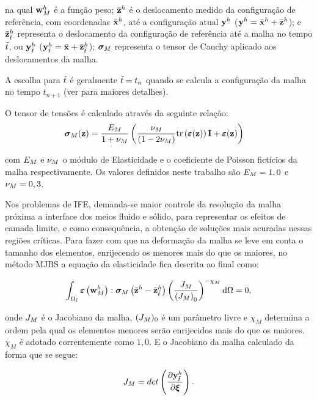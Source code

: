 \noindent na qual $\mathbf{w}_{M}^h$ é a função peso; $\bar{\mathbf{z}}^h$ é o deslocamento medido da configuração de referência, com coordenadas $\bar{\mathbf{x}}^h$, até a configuração atual $\mathbf{y}^h$ ($\mathbf{y}^h = \bar{\mathbf{x}}^h +\bar{\mathbf{z}}^h $); e 
$\bar{\mathbf{z}}_{\tilde{t}}^h$ representa o deslocamento da configuração de referência até a malha no tempo ${\tilde{t}}$, ou $\mathbf{y}^h_{\tilde{t}}$ ($\mathbf{y}^h_{\tilde{t}} = \bar{\mathbf{x}} + \bar{\mathbf{z}}_{\tilde{t}}^h$); $\boldsymbol{\sigma}_{M}$ representa o tensor de Cauchy aplicado aos deslocamentos da malha.

A escolha para $\tilde{t}$ é geralmente $\tilde{t} = {t_{n}}$ quando se calcula a configuração da malha no tempo ${t_{n+1}}$ (ver  para maiores detalhes). 

O tensor de tensões é calculado através da seguinte relação:
\begin{align}
	\boldsymbol{\sigma}_{M}(\mathbf{z})
	&=
	\frac{E_{M}}{1+\nu_{M}}
	\left(
	\frac{\nu_{M}}{(1 - 2 \nu_{M})}
	\mathrm{tr}\left(\bm{\varepsilon}(\mathbf{z})\right)\mathbf{I}
	+
	\bm{\varepsilon}(\mathbf{z})
	\right)
\end{align}

\noindent com $E_{M}$ e $\nu_{M}$ o módulo de Elasticidade e o coeficiente de Poisson fictícios da malha respectivamente. Os valores definidos neste trabalho são $E_{M} =1,0$ e $\nu_{M} = 0,3$.

Nos problemas de IFE, demanda-se maior controle da resolução da malha próxima a interface dos meios fluido e sólido, para representar os efeitos de camada limite, e como consequência, a obtenção de soluções mais acuradas nessas regiões críticas. Para fazer com que na deformação da malha se leve em conta o tamanho dos elementos, enrijecendo os menores mais do que os maiores, no método MJBS a equação da elasticidade fica descrita ao final como:

\begin{align}
	\int_{\Omega_{\tilde{t}}} \bm{\varepsilon} \left(\mathbf{w}_{M}^h\right) : \boldsymbol{\sigma}_{M} \left(\bar{\mathbf{z}}^h- \bar{\mathbf{z}}_{\tilde{t}}^h\right) \left(\frac{J_{M}}{\left({J_{M}}\right)_0}\right)^{-\chi_M} \mathrm{d} \Omega = 0, 
	\label{eq:elasticityMJBS}
\end{align}

\noindent onde $J_{M}$ é o Jacobiano da malha, $(J_{M})_0$ é um parâmetro livre e $\chi_M$ determina a ordem pela qual os elementos menores serão enrijecidos mais do que os maiores.  $\chi_M$ é adotado correntemente como $1,0$. E o Jacobiano da malha calculado da forma que se segue:

\begin{align}
	J_{M} = det\left(\frac{\partial\mathbf{y}^h_{\tilde{t}}}{\partial\boldsymbol{\xi}}\right).
\end{align}

